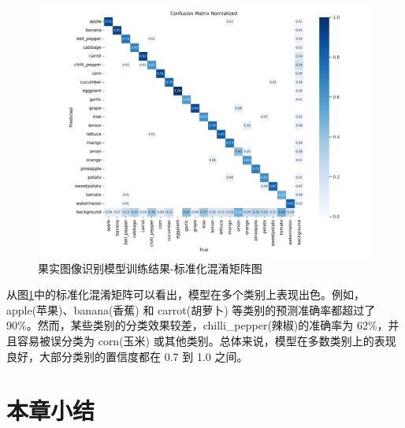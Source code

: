 \begin{figure}[H]
    \centering
    \includegraphics[width=0.8\linewidth]{../source/aws-img/yolov8/out/image/confusion_matrix_normalized.png}
    \caption{果实图像识别模型训练结果-标准化混淆矩阵图}
    \label{fig:confusion_matrix_normalized}
\end{figure}

从图\ref{fig:confusion_matrix_normalized}中的标准化混淆矩阵可以看出，模型在多个类别上表现出色。例如，apple(苹果)、banana(香蕉) 和 carrot(胡萝卜) 等类别的预测准确率都超过了 90\%。然而，某些类别的分类效果较差，chilli\_pepper(辣椒)的准确率为 62\%，并且容易被误分类为 corn(玉米) 或其他类别。总体来说，模型在多数类别上的表现良好，大部分类别的置信度都在 0.7 到 1.0 之间。

\section{本章小结}